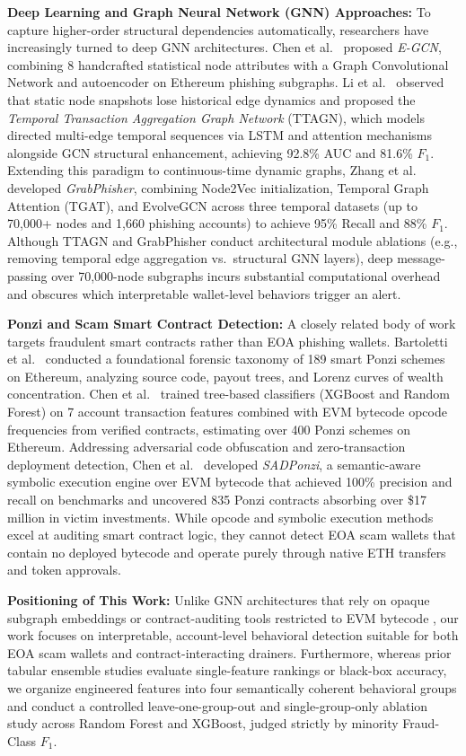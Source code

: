 \documentclass[conference]{IEEEtran}
\begin{document}
\textbf{Deep Learning and Graph Neural Network (GNN) Approaches:} To capture higher-order structural dependencies automatically, researchers have increasingly turned to deep GNN architectures. Chen et al.~\cite{chen2020toit} proposed \emph{E-GCN}, combining 8 handcrafted statistical node attributes with a Graph Convolutional Network and autoencoder on Ethereum phishing subgraphs. Li et al.~\cite{li2022} observed that static node snapshots lose historical edge dynamics and proposed the \emph{Temporal Transaction Aggregation Graph Network} (TTAGN), which models directed multi-edge temporal sequences via LSTM and attention mechanisms alongside GCN structural enhancement, achieving 92.8\% AUC and 81.6\% $F_1$. Extending this paradigm to continuous-time dynamic graphs, Zhang et al.~\cite{zhang2024} developed \emph{GrabPhisher}, combining Node2Vec initialization, Temporal Graph Attention (TGAT), and EvolveGCN across three temporal datasets (up to 70,000+ nodes and 1,660 phishing accounts) to achieve 95\% Recall and 88\% $F_1$. Although TTAGN and GrabPhisher conduct architectural module ablations (e.g., removing temporal edge aggregation vs.\ structural GNN layers), deep message-passing over 70,000-node subgraphs incurs substantial computational overhead and obscures which interpretable wallet-level behaviors trigger an alert.

\textbf{Ponzi and Scam Smart Contract Detection:} A closely related body of work targets fraudulent smart contracts rather than EOA phishing wallets. Bartoletti et al.~\cite{bartoletti2020} conducted a foundational forensic taxonomy of 189 smart Ponzi schemes on Ethereum, analyzing source code, payout trees, and Lorenz curves of wealth concentration. Chen et al.~\cite{chen2018} trained tree-based classifiers (XGBoost and Random Forest) on 7 account transaction features combined with EVM bytecode opcode frequencies from verified contracts, estimating over 400 Ponzi schemes on Ethereum. Addressing adversarial code obfuscation and zero-transaction deployment detection, Chen et al.~\cite{chen2021} developed \emph{SADPonzi}, a semantic-aware symbolic execution engine over EVM bytecode that achieved 100\% precision and recall on benchmarks and uncovered 835 Ponzi contracts absorbing over \$17 million in victim investments. While opcode and symbolic execution methods excel at auditing smart contract logic, they cannot detect EOA scam wallets that contain no deployed bytecode and operate purely through native ETH transfers and token approvals.

\textbf{Positioning of This Work:} Unlike GNN architectures that rely on opaque subgraph embeddings \cite{wu2020, chen2020toit, li2022, zhang2024} or contract-auditing tools restricted to EVM bytecode \cite{chen2018, bartoletti2020, chen2021}, our work focuses on interpretable, account-level behavioral detection suitable for both EOA scam wallets and contract-interacting drainers. Furthermore, whereas prior tabular ensemble studies \cite{farrugia2020, chithanuru2025, gu2025} evaluate single-feature rankings or black-box accuracy, we organize engineered features into four semantically coherent behavioral groups and conduct a controlled leave-one-group-out and single-group-only ablation study across Random Forest and XGBoost, judged strictly by minority Fraud-Class $F_1$.
\end{document}
